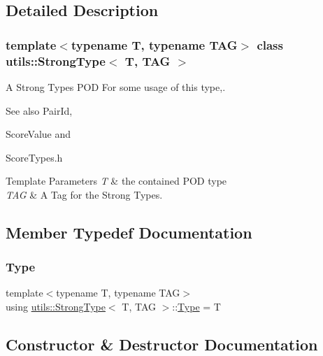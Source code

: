 \subsection{Detailed Description}
\subsubsection*{template$<$typename T, typename T\+AG$>$\newline
class utils\+::\+Strong\+Type$<$ T, T\+A\+G $>$}

A Strong Types P\+OD For some usage of this type,. 

\begin{DoxySeeAlso}{See also}
Pair\+Id, 

Score\+Value and 

Score\+Types.\+h 
\end{DoxySeeAlso}

\begin{DoxyTemplParams}{Template Parameters}
{\em T} & the contained P\+OD type \\
\hline
{\em T\+AG} & A Tag for the Strong Types. \\
\hline
\end{DoxyTemplParams}


\subsection{Member Typedef Documentation}
\mbox{\label{classutils_1_1_strong_type_a9acc2a79e43583e64f171f130b2ad2fd}} 
\subsubsection{\texorpdfstring{Type}{Type}}
{\footnotesize\ttfamily template$<$typename T, typename T\+AG$>$ \\
using \mbox{\hyperlink{classutils_1_1_strong_type}{utils\+::\+Strong\+Type}}$<$ T, T\+AG $>$\+::\mbox{\hyperlink{classutils_1_1_strong_type_a9acc2a79e43583e64f171f130b2ad2fd}{Type}} =  T}



\subsection{Constructor \& Destructor Documentation}
\mbox{\label{classutils_1_1_strong_type_ac339169b918b4504fb4de14041a484a6}} 
